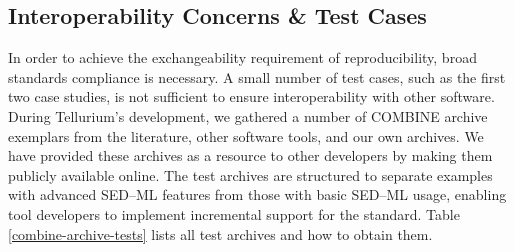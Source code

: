 \documentclass[10pt,letterpaper]{article}
\begin{document}
\subsection*{Interoperability Concerns \& Test Cases}

In order to achieve the exchangeability requirement of reproducibility, broad standards compliance is necessary. A small number of test cases, such as the first two case studies, is not sufficient to ensure interoperability with other software.
During Tellurium's development, we gathered a number of COMBINE archive exemplars from the literature, other software tools, and our own archives. We have provided these archives as a resource to other developers by making them publicly available online. The test archives are structured to separate examples with advanced SED--ML features from those with basic SED--ML usage, enabling tool developers to implement incremental support for the standard. Table \ref{combine-archive-tests} lists all test archives and how to obtain them.



\end{document}
